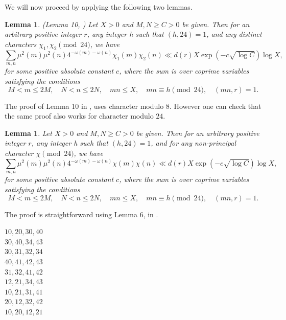 \documentclass[11pt]{article}
\newtheorem{lemma}[theorem]{Lemma}
\begin{document}
\noindent  We will now proceed by applying the following two lemmas. 
\begin{lemma}\label{lemma10}(Lemma 10, \cite{HeathBrown})
Let $X>0$ and $M,N\geq C>0$ be given. Then for an arbitrary positive integer $r$, any integer h such that $(h,24)=1$, and any distinct characters $\chi_{1},\chi_{2}\pmod{24}$, we have
$$\sum\limits_{m,n}\mu^{2}(m)\mu^{2}(n)4^{-\omega(m)-\omega(n)}\chi_{1}(m)\chi_{2}(n)\ll d(r)X\exp(-c\sqrt{\log C})\log X,$$
for some positive absolute constant $c$, where the sum is over coprime variables satisfying the conditions
$$M<m\leq 2M,\quad N<n\leq 2N,\quad mn\leq X,\quad mn\equiv h\pmod{24},\quad (mn,r)=1.$$
\end{lemma}
\noindent The proof of Lemma 10 in \cite{HeathBrown}, uses character modulo $8$. However one can check that the same proof also works for character modulo $24$.
\begin{lemma}\label{characterlemma}
Let $X>0$ and $M,N\geq C>0$ be given. Then for an arbitrary positive integer $r$, any integer h such that $(h,24)=1$, and for any non-principal character $\chi \pmod{24}$, we have
$$\sum\limits_{m,n}\mu^{2}(m)\mu^{2}(n)4^{-\omega(m)-\omega(n)}\chi(m)\chi(n)\ll d(r)X\exp(-c\sqrt{\log C})\log X,$$
for some positive absolute constant $c$, where the sum is over coprime variables satisfying the conditions
$$M<m\leq 2M,\quad N<n\leq 2N,\quad mn\leq X,\quad mn\equiv h\pmod{24},\quad (mn,r)=1.$$
\end{lemma}
\noindent The proof is straightforward using Lemma 6, in \cite{HeathBrown}.\\

\begin{center}
$10,20,30,40$\\
$30,40,34,43$\\
$30,31,32,34$\\
$40,41,42,43$\\
$31,32,41,42$\\
$12,21,34,43$\\
$10,21,31,41$\\
$20,12,32,42$\\
$10,20,12,21$\\
\end{center}
\end{document}
